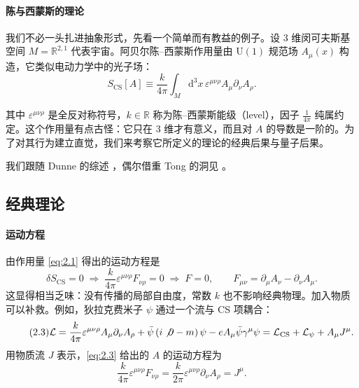 \documentclass[11pt,a4paper]{article}
\newcommand{\R}{\mathbb{R}}
\newcommand{\dd}{\mathrm{d}}
\begin{document}
\paragraph{陈与西蒙斯的理论} %
我们不必一头扎进抽象形式，先看一个简单而有教益的例子。设 3 维闵可夫斯基空间 $M=\R^{2,1}$ 代表宇宙。阿贝尔陈--西蒙斯作用量由 $\mathrm{U}(1)$ 规范场 $A_\mu(x)$ 构造，它类似电动力学中的光子场：
\begin{equation}\tag{2.1}\label{eq:2.1}
  S_{\mathrm{CS}}[A] \equiv \frac{k}{4\pi}\int_M \dd^3x\,\varepsilon^{\mu\nu\rho}A_\mu\partial_\nu A_\rho .
\end{equation}

其中 $\varepsilon^{\mu\nu\rho}$ 是全反对称符号，$k\in\R$ 称为陈--西蒙斯能级（level），因子 $\frac{1}{4\pi}$ 纯属约定。这个作用量有点古怪：它只在 3 维才有意义，而且对 $A$ 的导数是一阶的。为了对其行为建立直觉，我们来考察它所定义的理论的经典后果与量子后果。

我们跟随 Dunne 的综述 \cite{dunne}，偶尔借重 Tong 的洞见 \cite{tong_gauge,tong_qhe}。

\subsection{经典理论}\label{sec:2.1}

\paragraph{运动方程} %
由作用量 \eqref{eq:2.1} 得出的运动方程是
\begin{equation}\tag{2.2}\label{eq:2.2}
  \delta S_{\mathrm{CS}} = 0 \;\Longrightarrow\; \frac{k}{4\pi}\varepsilon^{\mu\nu\rho}F_{\nu\rho} = 0
  \;\Longrightarrow\; F = 0, \qquad F_{\mu\nu} = \partial_\mu A_\nu - \partial_\nu A_\mu .
\end{equation}
这显得相当乏味：没有传播的局部自由度，常数 $k$ 也不影响经典物理。加入物质可以补救。例如，狄拉克费米子 $\psi$ 通过一个流与 CS 项耦合：
\begin{equation}\tag{2.3}\label{eq:2.3}
  \mathcal{L} = \frac{k}{4\pi}\varepsilon^{\mu\nu\rho}A_\mu\partial_\nu A_\rho
  + \bar{\psi}\left(i\not\partial - m\right)\psi
  - eA_\mu\bar{\psi}\gamma^\mu\psi
  = \mathcal{L}_{\mathrm{CS}} + \mathcal{L}_\psi + A_\mu J^\mu .
\end{equation}
用物质流 $J$ 表示，\eqref{eq:2.3} 给出的 $A$ 的运动方程为
\begin{equation}\tag{2.4}\label{eq:2.4}
  \frac{k}{4\pi}\varepsilon^{\mu\nu\rho}F_{\nu\rho}
  = \frac{k}{2\pi}\varepsilon^{\mu\nu\rho}\partial_\nu A_\rho = J^\mu .
\end{equation}
\end{document}
